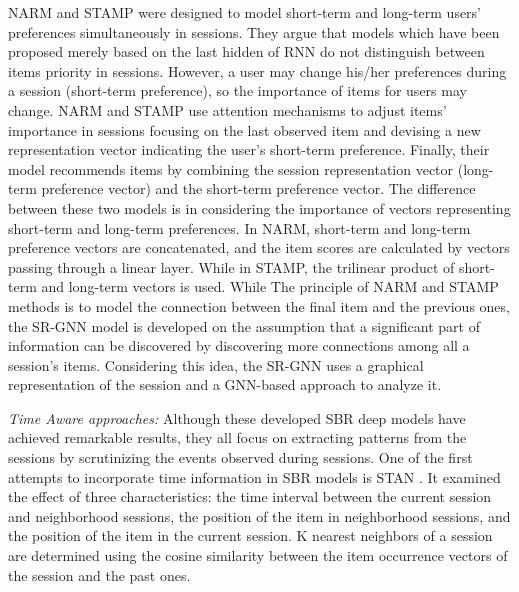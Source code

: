 \documentclass[3p, preprint, times]{elsarticle}
\begin{document}
NARM \cite{li2017neural} and STAMP \cite{liu2018stamp} were designed to model short-term and long-term users' preferences simultaneously in sessions. They argue that models which have been proposed merely based on the last hidden of RNN do not distinguish between items priority in sessions. However, a user may change his/her preferences during a session (short-term preference), so the importance of items for users may change. NARM and STAMP use attention mechanisms to adjust items' importance in sessions focusing on the last observed item and devising a new representation vector indicating the user's short-term preference. Finally, their model recommends items by combining the session representation vector (long-term preference vector) and the short-term preference vector. The difference between these two models is in considering the importance of vectors representing short-term and long-term preferences. In NARM, short-term and long-term preference vectors are concatenated, and the item scores are calculated by vectors passing through a linear layer. While in STAMP, the trilinear product of short-term and long-term vectors is used. While The principle of NARM and STAMP methods is to model the connection between the final item and the previous ones, the SR-GNN model \cite{wu2019session} is developed on the assumption that a significant part of information can be discovered by discovering more connections among all a session's items. Considering this idea, the SR-GNN uses a graphical representation of the session and a GNN-based approach to analyze it. 

\textit{Time Aware approaches:} Although these developed SBR deep models have achieved remarkable results, they all focus on extracting patterns from the sessions by scrutinizing the events observed during sessions. One of the first attempts to incorporate time information in SBR models is STAN \cite{garg2019sequence}. It examined the effect of three characteristics: the time interval between the current session and neighborhood sessions, the position of the item in neighborhood sessions, and the position of the item in the current session. K nearest neighbors of a session are determined using the cosine similarity between the item occurrence vectors of the session and the past ones. 
\end{document}
